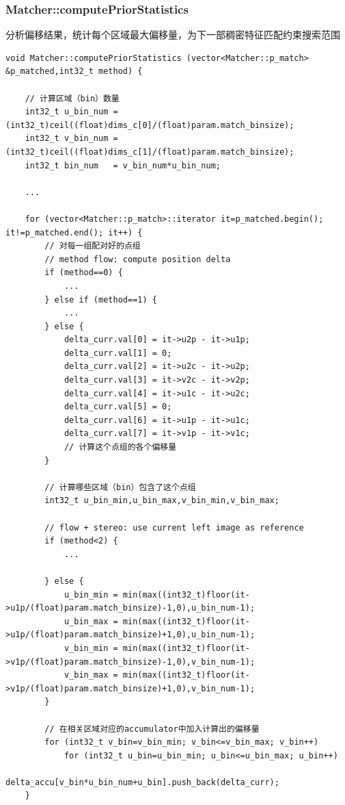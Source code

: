 \documentclass[UTF8]{ctexart}
\begin{document}
    \subsubsection{Matcher::computePriorStatistics}
    分析偏移结果，统计每个区域最大偏移量，为下一部稠密特征匹配约束搜索范围
    \begin{verbatim}
void Matcher::computePriorStatistics (vector<Matcher::p_match> &p_matched,int32_t method) {
    
    // 计算区域（bin）数量
    int32_t u_bin_num = (int32_t)ceil((float)dims_c[0]/(float)param.match_binsize);
    int32_t v_bin_num = (int32_t)ceil((float)dims_c[1]/(float)param.match_binsize);
    int32_t bin_num   = v_bin_num*u_bin_num;
    
    ...

    for (vector<Matcher::p_match>::iterator it=p_matched.begin(); it!=p_matched.end(); it++) {
        // 对每一组配对好的点组
        // method flow: compute position delta
        if (method==0) {
            ... 
        } else if (method==1) {
            ... 
        } else {
            delta_curr.val[0] = it->u2p - it->u1p;
            delta_curr.val[1] = 0;
            delta_curr.val[2] = it->u2c - it->u2p;
            delta_curr.val[3] = it->v2c - it->v2p;
            delta_curr.val[4] = it->u1c - it->u2c;
            delta_curr.val[5] = 0;
            delta_curr.val[6] = it->u1p - it->u1c;
            delta_curr.val[7] = it->v1p - it->v1c;
            // 计算这个点组的各个偏移量
        }
        
        // 计算哪些区域（bin）包含了这个点组
        int32_t u_bin_min,u_bin_max,v_bin_min,v_bin_max;

        // flow + stereo: use current left image as reference
        if (method<2) {
            ...
        
        } else {
            u_bin_min = min(max((int32_t)floor(it->u1p/(float)param.match_binsize)-1,0),u_bin_num-1);
            u_bin_max = min(max((int32_t)floor(it->u1p/(float)param.match_binsize)+1,0),u_bin_num-1);
            v_bin_min = min(max((int32_t)floor(it->v1p/(float)param.match_binsize)-1,0),v_bin_num-1);
            v_bin_max = min(max((int32_t)floor(it->v1p/(float)param.match_binsize)+1,0),v_bin_num-1);
        }
        
        // 在相关区域对应的accumulator中加入计算出的偏移量
        for (int32_t v_bin=v_bin_min; v_bin<=v_bin_max; v_bin++)
            for (int32_t u_bin=u_bin_min; u_bin<=u_bin_max; u_bin++)
                delta_accu[v_bin*u_bin_num+u_bin].push_back(delta_curr);
    }
    

\end{verbatim}
\end{document}
